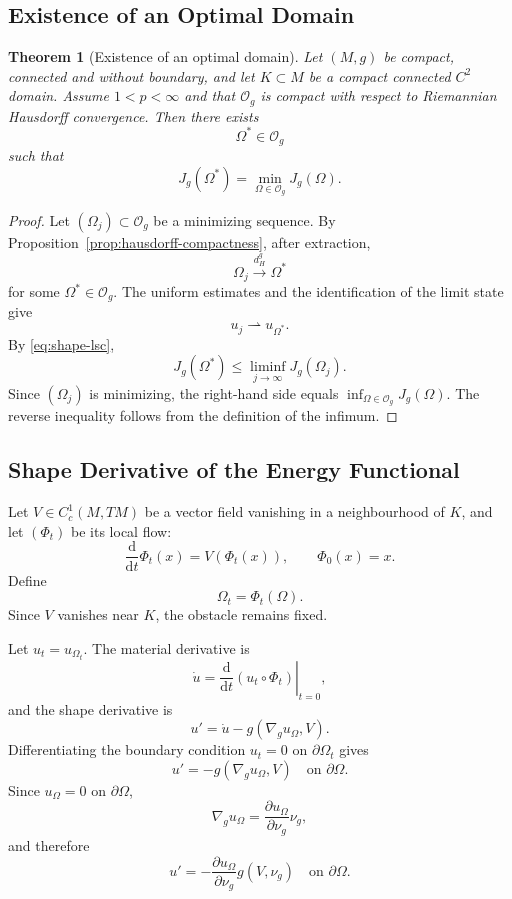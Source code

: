 \documentclass[11pt,a4paper]{article}
\newtheorem{theorem}{Theorem}[section]
\theoremstyle{definition}
\theoremstyle{remark}
\newcommand{\Og}{\mathcal{O}_g}
\newcommand{\gradg}{\nabla_g}
\newcommand{\dd}{\mathrm{d}}
\begin{document}
\subsection{Existence of an Optimal Domain}

\begin{theorem}[Existence of an optimal domain]
\label{thm:optimal-domain}
Let $(M,g)$ be compact, connected and without boundary, and let
$K\subset M$ be a compact connected $C^2$ domain. Assume
$1<p<\infty$ and that $\Og$ is compact with respect to
Riemannian Hausdorff convergence. Then there exists
\[
\Omega^\ast\in\Og
\]
such that
\[
J_g(\Omega^\ast)
=
\min_{\Omega\in\Og}J_g(\Omega).
\]
\end{theorem}

\begin{proof}
Let $(\Omega_j)\subset\Og$ be a minimizing sequence. By
Proposition~\ref{prop:hausdorff-compactness}, after extraction,
\[
\Omega_j\xrightarrow{d_H^g}\Omega^\ast
\]
for some $\Omega^\ast\in\Og$. The uniform estimates and the
identification of the limit state give
\[
u_j\rightharpoonup u_{\Omega^\ast}.
\]
By \eqref{eq:shape-lsc},
\[
J_g(\Omega^\ast)
\leq
\liminf_{j\to\infty}J_g(\Omega_j).
\]
Since $(\Omega_j)$ is minimizing, the right-hand side equals
$\inf_{\Omega\in\Og}J_g(\Omega)$. The reverse inequality follows
from the definition of the infimum.
\end{proof}

\subsection{Shape Derivative of the Energy Functional}

Let $V\in C_c^1(M,TM)$ be a vector field vanishing in a neighbourhood
of $K$, and let $(\Phi_t)$ be its local flow:
\[
\frac{\dd}{\dd t}\Phi_t(x)
=
V(\Phi_t(x)),
\qquad
\Phi_0(x)=x.
\]
Define
\[
\Omega_t=\Phi_t(\Omega).
\]
Since $V$ vanishes near $K$, the obstacle remains fixed.

Let $u_t=u_{\Omega_t}$. The material derivative is
\[
\dot u
=
\left.
\frac{\dd}{\dd t}
(u_t\circ\Phi_t)
\right|_{t=0},
\]
and the shape derivative is
\[
u'
=
\dot u-g(\gradg u_\Omega,V).
\]
Differentiating the boundary condition
$u_t=0$ on $\partial\Omega_t$ gives
\[
u'=-g(\gradg u_\Omega,V)
\quad\text{on }\partial\Omega.
\]
Since $u_\Omega=0$ on $\partial\Omega$,
\[
\gradg u_\Omega
=
\frac{\partial u_\Omega}{\partial\nu_g}\nu_g,
\]
and therefore
\begin{equation}
u'
=
-\frac{\partial u_\Omega}{\partial\nu_g}
g(V,\nu_g)
\quad\text{on }\partial\Omega.
\label{eq:shape-derivative-boundary}
\end{equation}
\end{document}
